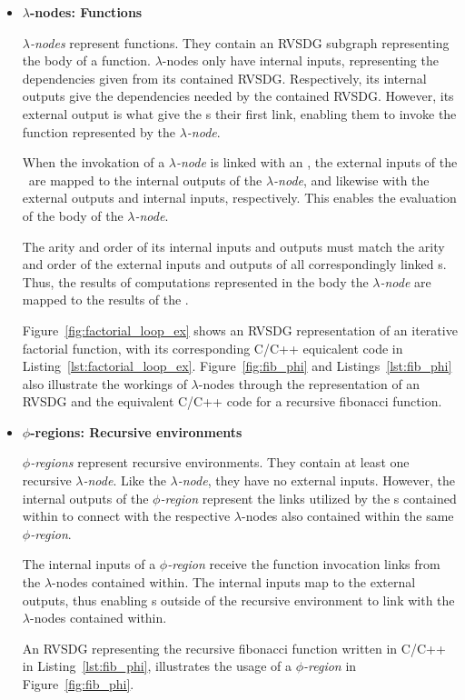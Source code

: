 \begin{itemize}
\item \textbf{$\lambda$-nodes: Functions}

\textit{$\lambda$-nodes} represent functions. They contain an RVSDG subgraph
representing the body of a function. $\lambda$-nodes only have internal
inputs, representing the dependencies given from its contained RVSDG.
Respectively, its internal outputs give the dependencies needed by the contained
RVSDG. However, its external output is what give the \applyNode s their first
link, enabling them to invoke the function represented by the
\textit{$\lambda$-node}.

When the invokation of a \textit{$\lambda$-node} is linked with an \applyNode ,
the external inputs of the \applyNode~are mapped to the internal outputs of the
\textit{$\lambda$-node}, and likewise with the external outputs and internal
inputs, respectively. This enables the evaluation of the body of the
\textit{$\lambda$-node}.

The arity and order of its internal inputs and outputs must match the arity and
order of the external inputs and outputs of all correspondingly linked
\applyNode s. Thus, the results of computations represented in the body the
\textit{$\lambda$-node} are mapped to the results of the \applyNode .

Figure~\ref{fig:factorial_loop_ex} shows an RVSDG representation of an iterative
factorial function, with its corresponding C/C++ equicalent code in
Listing~\ref{lst:factorial_loop_ex}. Figure~\ref{fig:fib_phi} and
Listings~\ref{lst:fib_phi} also illustrate the workings of $\lambda$-nodes
through the representation of an RVSDG and the equivalent C/C++ code for a
recursive fibonacci function.

\item \textbf{$\phi$-regions: Recursive environments}

\textit{$\phi$-regions} represent recursive environments. They contain at least
one recursive \textit{$\lambda$-node}. Like the \textit{$\lambda$-node}, they
have no external inputs. However, the internal outputs of the
\textit{$\phi$-region} represent the links utilized by the \applyNode s
contained within to connect with the respective $\lambda$-nodes also
contained within the same \textit{$\phi$-region}.

The internal inputs of a \textit{$\phi$-region} receive the function invocation
links from the $\lambda$-nodes contained within. The internal inputs
map to the external outputs, thus enabling \applyNode s outside of the recursive
environment to link with the $\lambda$-nodes contained within.

An RVSDG representing the recursive fibonacci function written in C/C++ in
Listing~\ref{lst:fib_phi}, illustrates the usage of a \textit{$\phi$-region} in
Figure~\ref{fig:fib_phi}.

\end{itemize}

